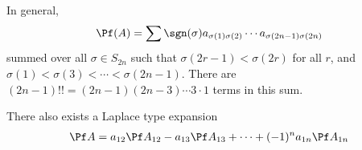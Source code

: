 In general,
\begin{align*}
    \Pf (A) = \sum \sgn (\sigma)a_{\sigma ( 1) \sigma (2)}\cdots a_{\sigma (2n-1)\sigma (2n)}
\end{align*}
summed over all $\sigma \in S_{2n}$ such that $\sigma (2r-1)<\sigma (2r)$ for all $r$, and $\sigma(1) < \sigma (3) < \cdots  < \sigma ( 2n-1)$. There are $(2n-1)!! = (2n-1)(2n-3)\cdots 3\cdot 1$ terms in this sum.

There also exists a Laplace type expansion
\begin{align*}
    \Pf A = a_{12}\Pf A_{12}-a_{13}\Pf A_{13}+\cdots + (-1)^n a_{1n}\Pf A_{1n}
\end{align*}
